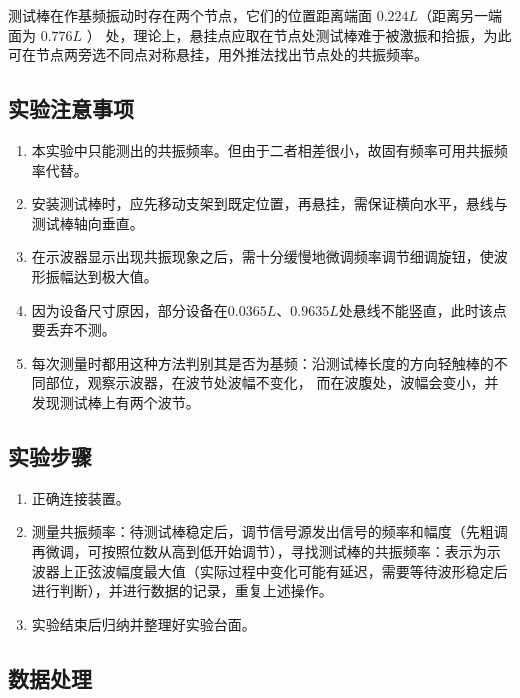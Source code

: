 \documentclass[UTF8]{article}
\theoremstyle{MyLineTheoremStyle} %
\theoremstyle{MyBlockTheoremStyle} %
\theoremstyle{MySubsubsectionStyle} %
\begin{document}
测试棒在作基频振动时存在两个节点，它们的位置距离端面 $0.224L $（距离另一端面为 $0.776 L$ ）
处，理论上，悬挂点应取在节点处测试棒难于被激振和拾振，为此可在节点两旁选不同点对称悬挂，用外推法找出节点处的共振频率。

\subsection{实验注意事项}

\begin{enumerate}
\item 本实验中只能测出的共振频率。但由于二者相差很小，故固有频率可用共振频率代替。

\item 安装测试棒时，应先移动支架到既定位置，再悬挂，需保证横向水平，悬线与测试棒轴向垂直。

\item 在示波器显示出现共振现象之后，需十分缓慢地微调频率调节细调旋钮，使波形振幅达到极大值。

\item 因为设备尺寸原因，部分设备在$0.0365L$、$ 0.9635L$处悬线不能竖直，此时该点要丢弃不测。

\item 每次测量时都用这种方法判别其是否为基频：沿测试棒长度的方向轻触棒的不同部位，观察示波器，在波节处波幅不变化，
而在波腹处，波幅会变小，并发现测试棒上有两个波节。

\end{enumerate}

\subsection{实验步骤}
\begin{enumerate}
\item 正确连接装置。

\item 测量共振频率：待测试棒稳定后，调节信号源发出信号的频率和幅度（先粗调再微调，可按照位数从高到低开始调节），寻找测试棒的共振频率：表示为示波器上正弦波幅度最大值（实际过程中变化可能有延迟，需要等待波形稳定后进行判断），并进行数据的记录，重复上述操作。

\item 实验结束后归纳并整理好实验台面。

\end{enumerate}

\subsection{数据处理}
\end{document}
